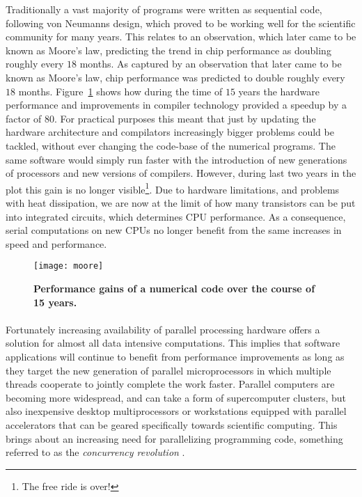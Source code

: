 Traditionally a vast majority of programs were written as sequential code, following von Neumanns design, which proved to be working well for the scientific community for many years.
This relates to an observation, which later came to be known as Moore's law, predicting the trend in chip performance as doubling roughly every $18$ months.
As captured by an observation that later came to be known as Moore's law, chip performance was predicted to double roughly every $18$ months.
Figure~\ref{fig:moore} shows how during the time of $15$ years the hardware performance and improvements in compiler technology provided a speedup by a factor of $80$.
For practical purposes this meant that just by updating the hardware architecture and compilators %
increasingly bigger problems could be tackled, without ever changing the code-base of the numerical programs. 
The same software would simply run faster with the introduction of new generations of processors and new versions of compilers.
However, during last two years in the plot this gain is no longer visible\footnote{The free ride is over!}.
Due to hardware limitations, and problems with heat dissipation, we are now at the limit of how many transistors can be put into integrated circuits, which determines CPU performance.
As a consequence, serial computations on new CPUs no longer benefit from the same increases in speed and performance.

\begin{figure}[H]
\centering
\texttt{[image: moore]}
\caption{
{ \footnotesize 
{\bf Performance gains of a numerical code over the course of 15 years.}
} %
}
\label{fig:moore}
\end{figure}


\paragraph{}
Fortunately increasing availability of parallel processing hardware offers a solution for almost all data intensive computations.
This implies that software applications will continue to benefit from performance improvements as long as they target the new generation of parallel microprocessors in which multiple threads cooperate to jointly complete the work faster.
Parallel computers are becoming more widespread, and can take a form of supercomputer clusters, but also inexpensive desktop multiprocessors or workstations equipped with parallel accelerators that can be geared specifically towards scientific computing.
This brings about an increasing need for parallelizing programming code, something referred to as the \textit{concurrency revolution} \citep{Sutter2005}.


